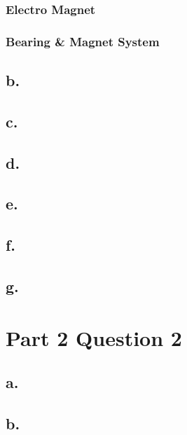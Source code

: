 \documentclass{article}
\theoremstyle{plain}
\theoremstyle{definition}
\theoremstyle{remark}
\begin{document}


\subsubsection{Electro Magnet}

\subsubsection{Bearing \& Magnet System}

\subsection*{b.}

\subsection*{c.}

\subsection*{d.}

\subsection*{e.}

\subsection*{f.}

\subsection*{g.}

\section{Part 2 Question 2}

\subsection*{a.}

\subsection*{b.}
\end{document}
